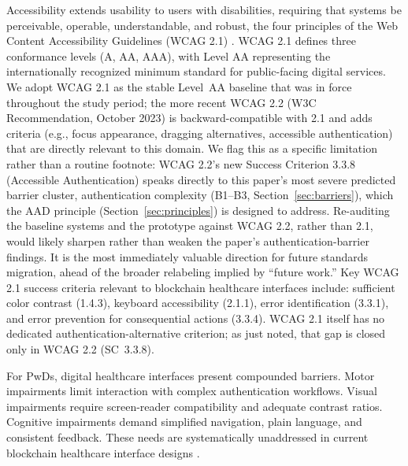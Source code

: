 \documentclass[journal,onecolumn]{IEEEtran}
\begin{document}
Accessibility extends usability to users with disabilities, requiring that systems be perceivable, operable, understandable, and robust, the four principles of the Web Content Accessibility Guidelines (WCAG 2.1) \cite{wcag21}. WCAG 2.1 defines three conformance levels (A, AA, AAA), with Level AA representing the internationally recognized minimum standard for public-facing digital services. We adopt WCAG 2.1 as the stable Level~AA baseline that was in force throughout the study period; the more recent WCAG 2.2 (W3C Recommendation, October 2023) is backward-compatible with 2.1 and adds criteria (e.g., focus appearance, dragging alternatives, accessible authentication) that are directly relevant to this domain. We flag this as a specific limitation rather than a routine footnote: WCAG 2.2's new Success Criterion 3.3.8 (Accessible Authentication) speaks directly to this paper's most severe predicted barrier cluster, authentication complexity (B1--B3, Section~\ref{sec:barriers}), which the AAD principle (Section~\ref{sec:principles}) is designed to address. Re-auditing the baseline systems and the prototype against WCAG 2.2, rather than 2.1, would likely sharpen rather than weaken the paper's authentication-barrier findings. It is the most immediately valuable direction for future standards migration, ahead of the broader relabeling implied by ``future work.'' Key WCAG 2.1 success criteria relevant to blockchain healthcare interfaces include: sufficient color contrast (1.4.3), keyboard accessibility (2.1.1), error identification (3.3.1), and error prevention for consequential actions (3.3.4). WCAG 2.1 itself has no dedicated authentication-alternative criterion; as just noted, that gap is closed only in WCAG 2.2 (SC~3.3.8).

For PwDs, digital healthcare interfaces present compounded barriers. Motor impairments limit interaction with complex authentication workflows. Visual impairments require screen-reader compatibility and adequate contrast ratios. Cognitive impairments demand simplified navigation, plain language, and consistent feedback. These needs are systematically unaddressed in current blockchain healthcare interface designs \cite{khalid2023blockchain}.
\end{document}
